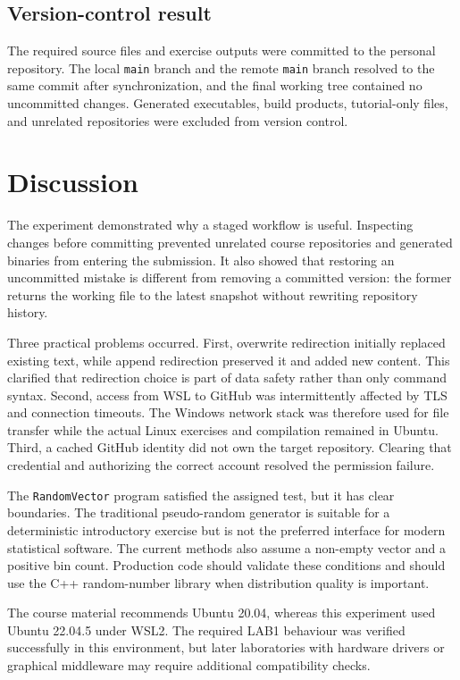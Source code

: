 \documentclass[11pt,a4paper]{article}
\begin{document}
\clearpage
\subsection{Version-control result}

The required source files and exercise outputs were committed to the personal repository. The local \texttt{main} branch and the remote \texttt{main} branch resolved to the same commit after synchronization, and the final working tree contained no uncommitted changes. Generated executables, build products, tutorial-only files, and unrelated repositories were excluded from version control.

\section{Discussion}

The experiment demonstrated why a staged workflow is useful. Inspecting changes before committing prevented unrelated course repositories and generated binaries from entering the submission. It also showed that restoring an uncommitted mistake is different from removing a committed version: the former returns the working file to the latest snapshot without rewriting repository history.

Three practical problems occurred. First, overwrite redirection initially replaced existing text, while append redirection preserved it and added new content. This clarified that redirection choice is part of data safety rather than only command syntax. Second, access from WSL to GitHub was intermittently affected by TLS and connection timeouts. The Windows network stack was therefore used for file transfer while the actual Linux exercises and compilation remained in Ubuntu. Third, a cached GitHub identity did not own the target repository. Clearing that credential and authorizing the correct account resolved the permission failure.

The \texttt{RandomVector} program satisfied the assigned test, but it has clear boundaries. The traditional pseudo-random generator is suitable for a deterministic introductory exercise but is not the preferred interface for modern statistical software. The current methods also assume a non-empty vector and a positive bin count. Production code should validate these conditions and should use the C++ random-number library when distribution quality is important.

The course material recommends Ubuntu 20.04, whereas this experiment used Ubuntu 22.04.5 under WSL2. The required LAB1 behaviour was verified successfully in this environment, but later laboratories with hardware drivers or graphical middleware may require additional compatibility checks.
\end{document}
